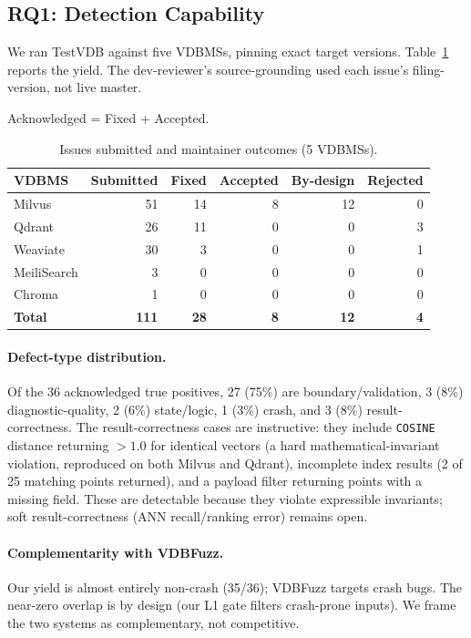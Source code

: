 \documentclass[sigconf, anonymous, review]{acmart}
\newcommand{\added}[1]{{\color{blue}#1}}
\begin{document}
\subsection{RQ1: Detection Capability}
We ran TestVDB against five VDBMSs, pinning exact target versions. Table~\ref{tab:yield} reports the yield.\added{ The dev-reviewer's source-grounding used each issue's filing-version, not live master.}

\begin{table}[t]
\caption{Issues submitted and maintainer outcomes (5 VDBMSs).}\added{ Acknowledged = Fixed + Accepted.}
\label{tab:yield}
\small
\begin{tabular}{lrrrrr}
\toprule
VDBMS & Submitted & Fixed & Accepted & By-design & Rejected \\
\midrule
Milvus      & 51 & 14 & 8 & 12 & 0 \\
Qdrant      & 26 & 11 & 0 & 0  & 3 \\
Weaviate    & 30 & 3  & 0 & 0  & 1 \\
MeiliSearch & 3  & 0  & 0 & 0  & 0 \\
Chroma      & 1  & 0  & 0 & 0  & 0 \\
\midrule
\textbf{Total} & \textbf{111} & \textbf{28} & \textbf{8} & \textbf{12} & \textbf{4} \\
\bottomrule
\end{tabular}
\end{table}

\paragraph{Defect-type distribution.} Of the 36 acknowledged true positives, 27 (75\%) are boundary/validation, 3 (8\%) diagnostic-quality, 2 (6\%) state/logic, 1 (3\%) crash, and 3 (8\%) result-correctness. The result-correctness cases are instructive: they include \texttt{COSINE} distance returning $>1.0$ for identical vectors (a hard mathematical-invariant violation, reproduced on both Milvus and Qdrant), incomplete index results (2 of 25 matching points returned), and a payload filter returning points with a missing field. These are detectable because they violate expressible invariants; soft result-correctness (ANN recall/ranking error) remains open.

\paragraph{Complementarity with VDBFuzz.} Our yield is almost entirely non-crash (35/36); VDBFuzz targets crash bugs. The near-zero overlap is by design (our L1 gate filters crash-prone inputs). We frame the two systems as complementary, not competitive.
\end{document}
